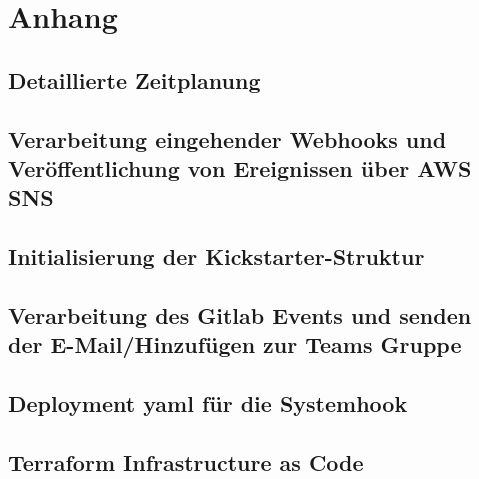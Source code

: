 \section{Anhang}
\subsection{Detaillierte Zeitplanung}
\label{app:Zeitplanung}

\clearpage


\clearpage

\clearpage

\clearpage

\clearpage

\clearpage

\clearpage


\clearpage

\subsection{Verarbeitung eingehender Webhooks und Veröffentlichung von Ereignissen über AWS SNS}
\label{app:CNMI}

\clearpage

\subsection{Initialisierung der Kickstarter-Struktur}
\label{app:kickStruct}

\clearpage

\subsection{Verarbeitung des Gitlab Events und senden der E-Mail/Hinzufügen zur Teams Gruppe}
\label{app:kickMain}

\clearpage

\subsection{Deployment yaml für die Systemhook}
\label{app:yamlFile}

\clearpage

\subsection{Terraform Infrastructure as Code}
\label{app:terraform}

\clearpage


\clearpage